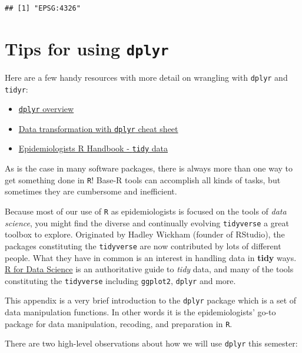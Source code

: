 \documentclass[
]{book}
\providecommand{\tightlist}{%
  \setlength{\itemsep}{0pt}\setlength{\parskip}{0pt}}
\begin{document}
\begin{verbatim}
## [1] "EPSG:4326"
\end{verbatim}

\hypertarget{dplyr}{%
\chapter{\texorpdfstring{Tips for using \texttt{dplyr}}{Tips for using dplyr}}\label{dplyr}}

Here are a few handy resources with more detail on wrangling with \texttt{dplyr} and \texttt{tidyr}:

\begin{itemize}
\tightlist
\item
  \href{https://dplyr.tidyverse.org/}{\texttt{dplyr} overview}
\item
  \href{https://github.com/rstudio/cheatsheets/raw/master/data-transformation.pdf}{Data transformation with \texttt{dplyr} cheat sheet}
\item
  \href{https://epirhandbook.com/transition-to-r.html?q=tidy\#tidy-data}{Epidemiologists R Handbook - \texttt{tidy} data}
\end{itemize}

As is the case in many software packages, there is always more than one way to get something done in \texttt{R}! Base-R tools can accomplish all kinds of tasks, but sometimes they are cumbersome and inefficient.

Because most of our use of \texttt{R} as epidemiologists is focused on the tools of \emph{data science}, you might find the diverse and continually evolving \texttt{tidyverse} a great toolbox to explore. Originated by Hadley Wickham (founder of RStudio), the packages constituting the \texttt{tidyverse} are now contributed by lots of different people. What they have in common is an interest in handling data in \textbf{tidy} ways. \href{https://r4ds.had.co.nz/}{R for Data Science} is an authoritative guide to \emph{tidy} data, and many of the tools constituting the \texttt{tidyverse} including \texttt{ggplot2}, \texttt{dplyr} and more.

This appendix is a very brief introduction to the \texttt{dplyr} package which is a set of data manipulation functions. In other words it is the epidemiologists' go-to package for data manipulation, recoding, and preparation in \texttt{R}.

There are two high-level observations about how we will use \texttt{dplyr} this semester:
\end{document}
